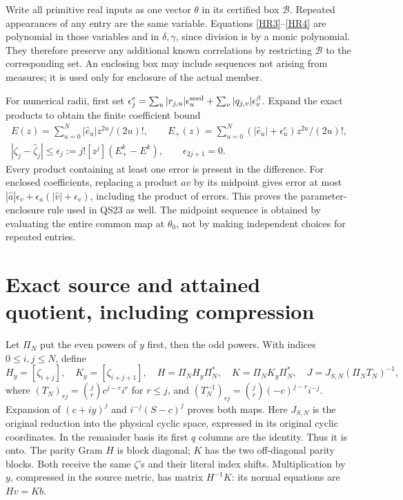 \documentclass[11pt]{article}
\begin{document}
Write all primitive real inputs as one vector \(\theta\) in its
certified box \(\mathcal B\). Repeated appearances of any entry are
the same variable. Equations \eqref{HR3}--\eqref{HR4} are polynomial
in those variables and in \(\delta,\gamma\), since division is by a
monic polynomial. They therefore preserve any additional known
correlations by restricting \(\mathcal B\) to the corresponding set.
An enclosing box may include sequences not arising from measures;
it is used only for enclosure of the actual member.

For numerical radii, first set
\(\epsilon_j^e=\sum_u|r_{j,u}|\epsilon_u^{\rm seed}
+\sum_v|q_{j,v}|\epsilon_v^\beta\).
Expand the exact products to obtain the finite coefficient bound
\begin{equation}\tag{HR5}\label{HR5}
\begin{gathered}
E(z)=\sum_{u=0}^N |\widehat e_u|z^{2u}/(2u)!,\qquad
E_+(z)=\sum_{u=0}^N(|\widehat e_u|+\epsilon_u^e)z^{2u}/(2u)!,\\
|\zeta_j-\widehat\zeta_j|\le
\epsilon_j:=j![z^j](E_+^k-E^k),\qquad \epsilon_{2j+1}=0.
\end{gathered}
\end{equation}
Every product containing at least one error is present in the difference.
For enclosed coefficients, replacing a product \(av\) by its midpoint
gives error at most \(|\widehat a|\epsilon_v+
\epsilon_a(|\widehat v|+\epsilon_v)\), including the product of errors.
This proves the parameter-enclosure rule used in QS23 as well.
The midpoint sequence is obtained by evaluating the entire common map
at \(\theta_0\), not by making independent choices for repeated entries.

\section{Exact source and attained quotient, including compression}

Let \(\Pi_N\) put the even powers of \(y\) first, then the odd powers.
With indices \(0\le i,j\le N\), define
\begin{equation}\tag{HR6}\label{HR6}
H_y=[\zeta_{i+j}],\quad K_y=[\zeta_{i+j+1}],\quad
H=\Pi_NH_y\Pi_N^*,\quad K=\Pi_NK_y\Pi_N^*,\quad
J=J_{S,N}(\Pi_NT_N)^{-1},
\end{equation}
where \((T_N)_{rj}=\binom jr c^{j-r}i^r\) for \(r\le j\), and
\((T_N^{-1})_{rj}=\binom jr(-c)^{j-r}i^{-j}\).
Expansion of \((c+iy)^j\) and \(i^{-j}(S-c)^j\) proves both maps.
Here \(J_{S,N}\) is the original reduction into the physical cyclic
space, expressed in its original cyclic coordinates. In the remainder
basis its first \(q\) columns are the identity. Thus it is onto.
The parity Gram \(H\) is block diagonal; \(K\) has the two off-diagonal
parity blocks. Both receive the same \(\zeta\)'s and their literal
index shifts. Multiplication by \(y\), compressed in the source metric,
has matrix \(H^{-1}K\): its normal equations are \(Hv=Kb\).
\end{document}
